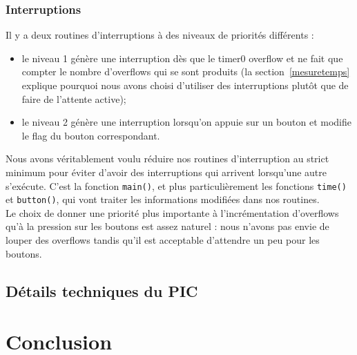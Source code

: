 \documentclass[12pt,a4paper]{article}
\begin{document}
    \subsubsection{Interruptions}
    Il y a deux routines d'interruptions à des niveaux de priorités différents :
    \begin{itemize}
    \item le niveau 1 génère une interruption dès que le timer0 overflow et ne fait que compter le nombre d'overflows qui se sont produits (la section~\ref{mesuretemps} explique pourquoi nous avons choisi d'utiliser des interruptions plutôt que de faire de l'attente active);
    \item le niveau 2 génère une interruption lorsqu'on appuie sur un bouton et modifie le flag du bouton correspondant.\\
    \end{itemize}
    
 	Nous avons véritablement voulu réduire nos routines d'interruption au strict minimum pour éviter d'avoir des interruptions qui arrivent lorsqu'une autre s'exécute. C'est la fonction \texttt{main()}, et plus particulièrement les fonctions \texttt{time()} et \texttt{button()}, qui vont traiter les informations modifiées dans nos routines.\\
	
	Le choix de donner une priorité plus importante à l'incrémentation d'overflows qu'à la pression sur les boutons est assez naturel : nous n'avons pas envie de louper des overflows tandis qu'il est acceptable d'attendre un peu pour les boutons.

    \subsection{Détails techniques du PIC}
    
    
\section{Conclusion}

\addto\captionsfrench{\renewcommand{\refname}{bib}}


    
\end{document}

